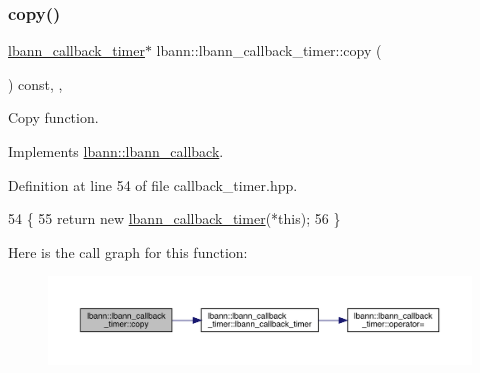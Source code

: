 \mbox{\label{classlbann_1_1lbann__callback__timer_a9ea5c598723debb7b098a6ce891571c6}} 
\subsubsection{\texorpdfstring{copy()}{copy()}}
{\footnotesize\ttfamily \hyperlink{classlbann_1_1lbann__callback__timer}{lbann\+\_\+callback\+\_\+timer}$\ast$ lbann\+::lbann\+\_\+callback\+\_\+timer\+::copy (\begin{DoxyParamCaption}{ }\end{DoxyParamCaption}) const\hspace{0.3cm}{\ttfamily [inline]}, {\ttfamily [override]}, {\ttfamily [virtual]}}

Copy function. 

Implements \hyperlink{classlbann_1_1lbann__callback_a9f545d1269a8c7af335625d049691f26}{lbann\+::lbann\+\_\+callback}.



Definition at line 54 of file callback\+\_\+timer.\+hpp.


\begin{DoxyCode}
54                                               \{
55     \textcolor{keywordflow}{return} \textcolor{keyword}{new} \hyperlink{classlbann_1_1lbann__callback__timer_a00fc86ddf14a4a5e9c6b65ff2e81dfb6}{lbann\_callback\_timer}(*\textcolor{keyword}{this});
56   \}
\end{DoxyCode}
Here is the call graph for this function\+:\nopagebreak
\begin{figure}[H]
\begin{center}
\leavevmode
\includegraphics[width=350pt]{classlbann_1_1lbann__callback__timer_a9ea5c598723debb7b098a6ce891571c6_cgraph}
\end{center}
\end{figure}
\mbox{\label{classlbann_1_1lbann__callback__timer_a32a3b87744ee0fcac931e8e69358ece9}} 

